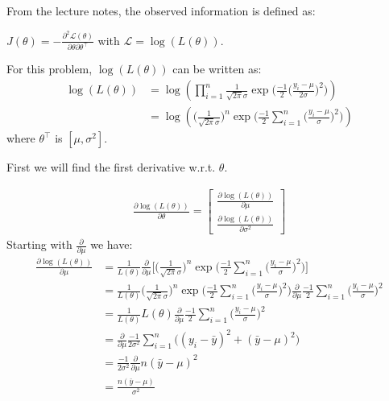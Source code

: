 
From the lecture notes, the observed information is defined as:
\begin{tcolorbox}[width=.5\linewidth,center, halign=flush center]
    $J(\theta) = -\frac{\partial^2 \mathcal{L}(\theta)}{\partial \theta \partial \theta^\intercal}$
    with $\mathcal{L} = \log(L(\theta))$.
\end{tcolorbox}

For this problem, $\log(L(\theta))$ can be written as: 
\begin{align}
    \label{log_likelihood}
    \log(L(\theta)) &= \log(\prod_{i=1}^n\frac{1}{\sqrt{2\pi}\sigma}\exp\Big(\frac{-1}{2}\Big(\frac{y_i - \mu}{2\sigma} \Big)^2\Big) )  \nonumber\\
                    &= \log(\Big(\frac{1}{\sqrt{2\pi}\sigma}\Big)^n \exp\Big(\frac{-1}{2}\sum_{i=1}^n\Big( \frac{y_i - \mu}{\sigma}\Big)^2 \Big) )
\end{align}
where $\theta^\intercal$ is $[ \mu, \sigma^2]$.

First we will find the first derivative w.r.t. $\theta$.

\begin{align*}
    \frac{\partial \log(L(\theta))}{\partial \theta} = 
    \begin{bmatrix}
        \frac{\partial \log(L(\theta))}{\partial \mu} \\ 
        \frac{\partial \log(L(\theta))}{\partial \sigma^2}
    \end{bmatrix}
\end{align*}
Starting with $\frac{\partial}{\partial\mu}$ we have:
\begin{align*}
    \frac{\partial \log(L(\theta))}{\partial \mu} 
    &= \frac{1}{L(\theta)}\frac{\partial}{\partial \mu}\Big[\Big(\frac{1}{\sqrt{2\pi}\sigma}\Big)^n \exp\Big(\frac{-1}{2}\sum_{i=1}^n \Big(\frac{y_i - \mu}{\sigma}\Big)^2 \Big)\Big]\\ 
    &= \frac{1}{L(\theta)}\Big(\frac{1}{\sqrt{2\pi}\sigma}\Big)^n \exp\Big(\frac{-1}{2}\sum_{i=1}^n \Big(\frac{y_i - \mu}{\sigma}\Big)^2 \Big)
    \frac{\partial}{\partial \mu}\frac{-1}{2}\sum_{i=1}^n\Big(\frac{y_i - \mu}{\sigma}\Big)^2\\ 
    &=\frac{1}{L(\theta)}L(\theta)\frac{\partial}{\partial \mu}\frac{-1}{2}\sum_{i=1}^n\Big(\frac{y_i - \mu}{\sigma}\Big)^2 \\
    &=\frac{\partial}{\partial \mu}\frac{-1}{2\sigma^2}\sum_{i=1}^n\big((y_i - \bar{y})^2+(\bar{y}-\mu)^2\big) \\
    &=\frac{-1}{2\sigma^2}\frac{\partial}{\partial \mu}n(\bar{y}-\mu)^2 \\
    &=\frac{n(\bar{y}-\mu)}{\sigma^2} \\
\end{align*}

